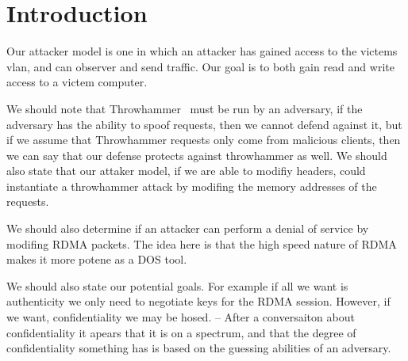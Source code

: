 \section{Introduction}
\label{sec:intro}

Our attacker model is one in which an attacker has gained access to the victems
vlan, and can observer and send traffic. Our goal is to both gain read and write access to a victem computer.

We should note that Throwhammer~\cite{216055} must be run by an adversary, if
the adversary has the ability to spoof requests, then we cannot defend against
it, but if we assume that Throwhammer requests only come from malicious
clients, then we can say that our defense protects against throwhammer as well.
We should also state that our attaker model, if we are able to modifiy headers,
could instantiate a throwhammer attack by modifing the memory addresses of the
requests.

We should also determine if an attacker can perform a denial of service by
modifing RDMA packets. The idea here is that the high speed nature of RDMA
makes it more potene as a DOS tool.

We should also state our potential goals. For example if all we want is
authenticity we only need to negotiate keys for the RDMA session. However, if
we want, confidentiality we may be hosed. -- After a conversaiton about
confidentiality it apears that it is on a spectrum, and that the degree of
confidentiality something has is based on the guessing abilities of an
adversary.

